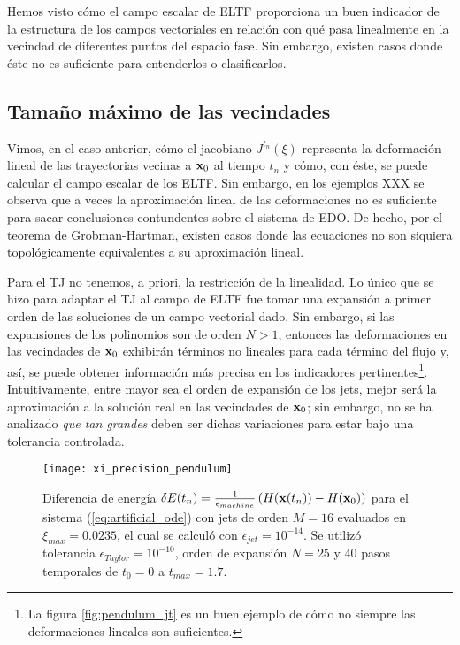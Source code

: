 Hemos visto cómo el campo escalar de ELTF proporciona un buen indicador de la estructura de los campos vectoriales en relación con qué pasa linealmente en la vecindad de diferentes puntos del espacio fase. Sin embargo, existen casos donde éste no es suficiente para entenderlos o clasificarlos. 


\subsection{Tamaño máximo de las vecindades}

Vimos, en el caso anterior, cómo el jacobiano $J^{t_n}(\xi)$ representa la deformación lineal de las trayectorias vecinas a $\mathbf{x}_0$ al tiempo $t_n$ y cómo, con éste, se puede calcular el campo escalar de los ELTF. Sin embargo, en los ejemplos XXX se observa que a veces la aproximación lineal de las deformaciones no es suficiente para sacar conclusiones contundentes sobre el sistema de EDO. De hecho, por el teorema de Grobman-Hartman, existen casos donde las ecuaciones no son siquiera topológicamente equivalentes a su aproximación lineal. 

Para el TJ no tenemos, a priori, la restricción de la linealidad. Lo único que se hizo para adaptar el TJ al campo de ELTF fue tomar una expansión a primer orden de las soluciones de un campo vectorial dado. Sin embargo, si las expansiones de los polinomios son de orden $N > 1$, entonces las deformaciones en las vecindades de $\mathbf{x}_0$ exhibirán términos no lineales para cada término del flujo y, así, se puede obtener información más precisa en los indicadores pertinentes\footnote{La figura \ref{fig:pendulum_jt} es un buen ejemplo de cómo no siempre las deformaciones lineales son suficientes.}. Intuitivamente, entre mayor sea el orden de expansión de los jets, mejor será la aproximación a la solución real en las vecindades de $\mathbf{x}_0$; sin embargo, no se ha analizado \textit{que tan grandes} deben ser dichas variaciones para estar bajo una tolerancia controlada.

\begin{figure}[h!]
	\centering
	\texttt{[image: xi\_precision\_pendulum]}
	\caption{Diferencia de energía $\delta E(t_n) = \frac{1}{\epsilon_{machine}} \left( H(\mathbf{x}(t_n)) - H(\mathbf{x}_0) \right)$ para el sistema (\ref{eq:artificial_ode}) con jets de orden $M=16$ evaluados en $\xi_{max} = 0.0235$, el cual se calculó con $\epsilon_{jet} = 10^{-14}$. Se utilizó tolerancia $\epsilon_{Taylor} = 10^{-10}$, orden de expansión $N = 25$ y $40$ pasos temporales de $t_0 = 0$ a $t_{max} = 1.7$.}
	\label{fig:xi_precision_pendulum}
\end{figure}

